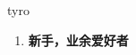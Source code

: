 
\begin{frame}
{\huge tyro}
\begin{center}
\begin{enumerate}\Large
  \item \textbf{新手，业余爱好者}
\end{enumerate}
\end{center}
\end{frame}
